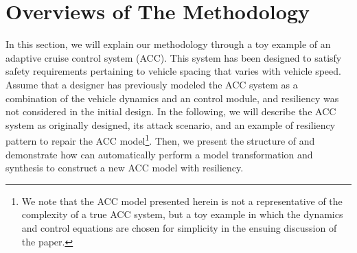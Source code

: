 
\section{Overviews of The Methodology}
%
%
%
In this section, we will explain our methodology through a toy example of an adaptive cruise control system (ACC). This system has been designed to satisfy safety requirements pertaining to vehicle spacing that varies with vehicle speed.
%
Assume that a designer has previously modeled the ACC system as a combination of the vehicle dynamics and an control module, and resiliency was not considered in the initial design. In the following, we will describe the ACC system as originally designed, its attack scenario, and an example of resiliency pattern to repair the ACC model\footnote{We note that the ACC model presented herein is not a representative of the complexity of a true ACC system, but a toy example in which the dynamics and control equations are chosen for simplicity in the ensuing discussion of the paper.}.
%
Then, we present the structure of \toolreaffirm and demonstrate how \toolreaffirm can automatically perform a model transformation and synthesis to construct a new ACC model with resiliency.
%
%
%

